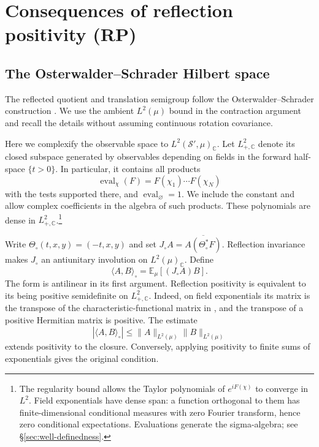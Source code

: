 \documentclass[11pt, letterpaper, reqno]{amsart}
\theoremstyle{definition}
\theoremstyle{remark}
\newcommand{\bbC}{\mathbb{C}}
\newcommand{\bbE}{\mathbb{E}}
\newcommand{\calS}{\mathcal{S}}
\begin{document}
\section{Consequences of reflection positivity (RP)}\label{sec:RP}

\subsection{The Osterwalder--Schrader Hilbert space}

The reflected quotient and translation semigroup follow the
Osterwalder--Schrader construction \cite[\S4.1, (4.3)--(4.9)]{OS}.
We use the ambient $L^2(\mu)$ bound in the contraction argument and
recall the details without assuming continuous rotation covariance.

Here we complexify the observable space to $L^2(\calS',\mu)_\bbC$.
Let $L^2_{+,\bbC}$ denote its closed subspace generated by observables
depending on fields in the forward half-space
$\{t>0\}$. In particular, it contains all products
\begin{equation}
 \operatorname{eval}_\chi(F)=F(\chi_1)\cdots F(\chi_N)
\end{equation}
with the tests supported there, and $\operatorname{eval}_\varnothing=1$.
We include the constant and allow complex coefficients in the algebra of such products.
These polynomials are dense in $L^2_{+,\bbC}$.\footnote{The regularity bound
allows the Taylor polynomials of $e^{iF(\chi)}$ to converge in $L^2$.
Field exponentials have dense span: a function orthogonal to them has
finite-dimensional conditional measures with zero Fourier transform,
hence zero conditional expectations. Evaluations generate the
sigma-algebra; see \S\ref{sec:well-definedness}.}

Write $\Theta_\circ(t,x,y)=(-t,x,y)$ and set
$J_\circ A=\overline{A(\Theta_\circ^*F)}$. Reflection invariance makes
$J_\circ$ an antiunitary involution on $L^2(\mu)_\bbC$. Define
\begin{equation}\label{eq:OS-form}
 \langle A,B\rangle_\circ=\bbE_\mu[(J_\circ A)B].
\end{equation}
The form is antilinear in its first argument. Reflection positivity is
equivalent to its being positive semidefinite on $L^2_{+,\bbC}$.
Indeed, on field exponentials its matrix is the transpose of the
characteristic-functional matrix in , and the transpose
of a positive Hermitian matrix is positive. The estimate
\begin{equation}\label{eq:class-contraction}
 |\langle A,B\rangle_\circ|\leq\|A\|_{L^2(\mu)}\|B\|_{L^2(\mu)}
\end{equation}
extends positivity to the closure. Conversely, applying positivity to
finite sums of exponentials gives the original condition.
\end{document}
